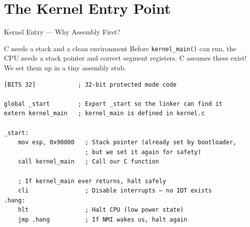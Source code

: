 \documentclass[aspectratio=169]{beamer}
\newcommand{\concept}[2]{%
  \begin{block}{#1}\smallskip #2\smallskip\end{block}\vspace{5pt}}
\begin{document}
\section{The Kernel Entry Point}

\begin{frame}[fragile]{Kernel Entry --- Why Assembly First?}
  \concept{C needs a stack and a clean environment}{
    Before \texttt{kernel\_main()} can run, the CPU needs a stack pointer and correct segment registers. C assumes these exist! We set them up in a tiny assembly stub.
  }
  \vspace{6pt}
  \begin{lstlisting}[style=asm]
[BITS 32]            ; 32-bit protected mode code

global _start        ; Export _start so the linker can find it
extern kernel_main   ; kernel_main is defined in kernel.c

_start:
    mov esp, 0x90000   ; Stack pointer (already set by bootloader,
                       ; but we set it again for safety)
    call kernel_main   ; Call our C function

    ; If kernel_main ever returns, halt safely
    cli                ; Disable interrupts — no IDT exists
.hang:
    hlt                ; Halt CPU (low power state)
    jmp .hang          ; If NMI wakes us, halt again
  \end{lstlisting}
\end{frame}
\end{document}
